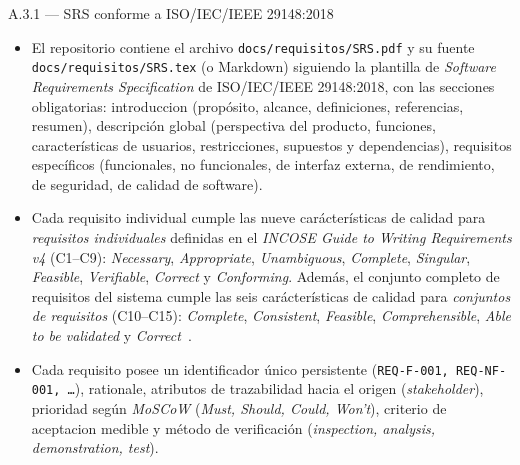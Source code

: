 \documentclass[11pt,a4paper]{article}
\begin{document}
\begin{cajaentregable}{A.3.1 --- SRS conforme a ISO/IEC/IEEE 29148:2018}
    \begin{itemize}
        \item El repositorio contiene el archivo \texttt{docs/requisitos/SRS.pdf} y su fuente \texttt{docs/requisitos/SRS.tex} (o Markdown) siguiendo la plantilla de \emph{Software Requirements Specification} de ISO/IEC/IEEE 29148:2018, con las secciones obligatorias: introduccion (prop\'{o}sito, alcance, definiciones, referencias, resumen), descripci\'{o}n global (perspectiva del producto, funciones, caracter\'{i}sticas de usuarios, restricciones, supuestos y dependencias), requisitos espec\'{i}ficos (funcionales, no funcionales, de interfaz externa, de rendimiento, de seguridad, de calidad de software).
        \item Cada requisito individual cumple las nueve car\'{a}cter\'{i}sticas de calidad para \emph{requisitos individuales} definidas en el \emph{INCOSE Guide to Writing Requirements v4} (C1--C9): \emph{Necessary}, \emph{Appropriate}, \emph{Unambiguous}, \emph{Complete}, \emph{Singular}, \emph{Feasible}, \emph{Verifiable}, \emph{Correct} y \emph{Conforming}. Adem\'{a}s, el conjunto completo de requisitos del sistema cumple las seis car\'{a}cter\'{i}sticas de calidad para \emph{conjuntos de requisitos} (C10--C15): \emph{Complete}, \emph{Consistent}, \emph{Feasible}, \emph{Comprehensible}, \emph{Able to be validated} y \emph{Correct}~\cite{incose2023requirements}.
        \item Cada requisito posee un identificador \'{u}nico persistente (\texttt{REQ-F-001, REQ-NF-001, \ldots}), rationale, atributos de trazabilidad hacia el origen (\emph{stakeholder}), prioridad seg\'{u}n \emph{MoSCoW} (\emph{Must, Should, Could, Won't}), criterio de aceptacion medible y m\'{e}todo de verificaci\'{o}n (\emph{inspection, analysis, demonstration, test}).
    \end{itemize}
\end{cajaentregable}
\end{document}
